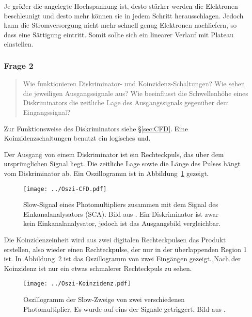 \documentclass[11pt, ngerman, fleqn, DIV=15, headinclude, BCOR=2cm]{scrreprt}
\begin{document}

Je größer die angelegte Hochspannung ist, desto stärker werden die Elektronen
beschleunigt und desto mehr können sie in jedem Schritt herausschlagen. Jedoch
kann die Stromversorgung nicht mehr schnell genug Elektronen nachliefern, so
dass eine Sättigung eintritt. Somit sollte sich ein linearer Verlauf mit
Plateau einstellen.

\subsubsection{Frage 2}

\begin{quote}
    Wie funktionieren Diskriminator- und Koinzidenz-Schaltungen? Wie sehen die
    jeweiligen Ausgangssignale aus? Wie beeinflusst die Schwellenhöhe eines
    Diskriminators die zeitliche Lage des Ausgangssignals gegenüber dem
    Eingangssignal?
\end{quote}

Zur Funktionsweise des Diskriminators siehe §\ref{sec:CFD}. Eine
Koinzidenzschaltungen benutzt ein logisches und.

Der Ausgang von einem Diskriminator ist ein Rechteckpuls, das über dem
ursprünglichen Signal liegt. Die zeitliche Lage sowie die Länge des Pulses
hängt vom Diskriminator ab. Ein Oszillogramm ist in
Abbildung~\ref{fig:oszi-cfd} gezeigt.

\begin{figure}[htbp]
    \centering
    \texttt{[image: ../Oszi-CFD.pdf]}
    \caption{%
        Slow-Signal eines Photomultipliers zusammen mit dem
        Signal des Einkanalanalysators (SCA). Bild aus
        \parencite[Abbildung~2.8]{Ueding/525}. Ein Diskriminator ist zwar kein
        Einkanalanalysator, jedoch ist das Ausgangsbild vergleichbar.
    }
    \label{fig:oszi-cfd}
\end{figure}

Die Koinzidenzeinheit wird aus zwei digitalen Rechteckpulsen das Produkt
erstellen, also wieder einen Rechteckpulse, der nur in der überlappenden Region
1 ist. In Abbildung~\ref{fig:oszi-koinzidenz} ist das Oszillogramm von zwei
Eingängen gezeigt. Nach der Koinzidenz ist nur ein etwas schmalerer
Rechteckpuls zu sehen.

\begin{figure}[htbp]
    \centering
    \texttt{[image: ../Oszi-Koinzidenz.pdf]}
    \caption{%
        Oszillogramm der Slow-Zweige von zwei verschiedenen Photomultiplier. Es
        wurde auf eins der Signale getriggert. Bild aus
        \parencite[Abbildung~2.24]{Ueding/525}.
    }
    \label{fig:oszi-koinzidenz}
\end{figure}
\end{document}
